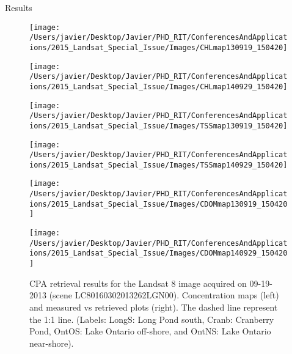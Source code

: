 \documentclass{beamer}
\begin{document}
\begin{frame}{}
\begin{columns}[t]
\begin{column}{.3\linewidth}
\begin{block}{Results}
\begin{figure}[htbp!]
  \begin{minipage}[c]{0.4\linewidth}
      \centering
      \texttt{[image: /Users/javier/Desktop/Javier/PHD\_RIT/ConferencesAndApplications/2015\_Landsat\_Special\_Issue/Images/CHLmap130919\_150420]}  
  \end{minipage}
  \hspace{1cm}
  \begin{minipage}[c]{0.4\linewidth}
      \centering
      \texttt{[image: /Users/javier/Desktop/Javier/PHD\_RIT/ConferencesAndApplications/2015\_Landsat\_Special\_Issue/Images/CHLmap140929\_150420]}  
  \end{minipage}
% 
  \begin{minipage}[c]{0.4\linewidth}
      \centering
      \texttt{[image: /Users/javier/Desktop/Javier/PHD\_RIT/ConferencesAndApplications/2015\_Landsat\_Special\_Issue/Images/TSSmap130919\_150420]}  
  \end{minipage}
  \hspace{1cm}
  \begin{minipage}[c]{0.4\linewidth}
      \centering
      \texttt{[image: /Users/javier/Desktop/Javier/PHD\_RIT/ConferencesAndApplications/2015\_Landsat\_Special\_Issue/Images/TSSmap140929\_150420]}  
  \end{minipage}

  \begin{minipage}[c]{0.4\linewidth}
      \centering
      \texttt{[image: /Users/javier/Desktop/Javier/PHD\_RIT/ConferencesAndApplications/2015\_Landsat\_Special\_Issue/Images/CDOMmap130919\_150420]}  
  \end{minipage}
  \hspace{1cm}
  \begin{minipage}[c]{0.4\linewidth}
      \centering
      \texttt{[image: /Users/javier/Desktop/Javier/PHD\_RIT/ConferencesAndApplications/2015\_Landsat\_Special\_Issue/Images/CDOMmap140929\_150420]}  
  \end{minipage}
% 
  \caption{CPA retrieval results for the Landsat 8 image acquired on 09-19-2013 (scene LC80160302013262LGN00). Concentration maps (left) and measured vs retrieved plots (right). The dashed line represent the 1:1 line. (Labels: LongS: Long Pond south, Cranb: Cranberry Pond, OntOS: Lake Ontario off-shore, and OntNS: Lake Ontario near-shore). \label{fig:CPAsMaps130919} } 
\end{figure}



\end{block}
\end{column}
\end{columns}
\end{frame}
\end{document}
